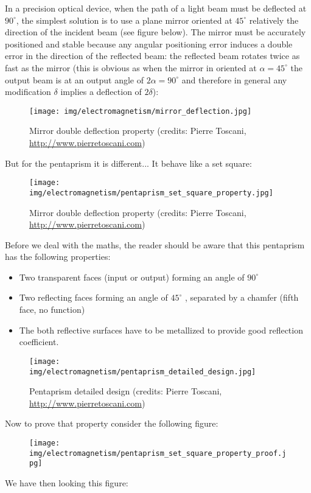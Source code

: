 	In a precision optical device, when the path of a light beam must be deflected at $90^\circ$, the simplest solution is to use a plane mirror oriented at $45^\circ$ relatively the direction of the incident beam (see figure below). The mirror must be accurately positioned and stable because any angular positioning error induces a double error in the direction of the reflected beam: the reflected beam rotates twice as fast as the mirror (this is obvious as when the mirror in oriented at $\alpha=45^\circ$ the output beam is at an output angle of $2\alpha=90^\circ$ and therefore in general any modification $\delta$ implies a deflection of $2\delta$):
	\begin{figure}[H]
		\centering
		\texttt{[image: img/electromagnetism/mirror\_deflection.jpg]}
		\caption{Mirror double deflection property (credits: Pierre Toscani, \url{http://www.pierretoscani.com})}
	\end{figure}
	But for the pentaprism it is different... It behave like a set square:
	\begin{figure}[H]
		\centering
		\texttt{[image: img/electromagnetism/pentaprism\_set\_square\_property.jpg]}
		\caption{Mirror double deflection property (credits: Pierre Toscani, \url{http://www.pierretoscani.com})}
	\end{figure}
	Before we deal with the maths, the reader should be aware that this pentaprism has the following properties:
	 \begin{itemize}
		\item Two transparent faces (input or output) forming an angle of $90^\circ$
		 \item Two reflecting faces forming an angle of $45^\circ$ , separated by a chamfer (fifth face, no function)
		\item The both reflective surfaces have to be metallized to provide good reflection coefficient.
	\end{itemize} 
	\begin{figure}[H]
		\centering
		\texttt{[image: img/electromagnetism/pentaprism\_detailed\_design.jpg]}
		\caption{Pentaprism detailed design (credits: Pierre Toscani, \url{http://www.pierretoscani.com})}
	\end{figure}
	Now to prove that property consider the following figure:
	\begin{figure}[H]
		\centering
		\texttt{[image: img/electromagnetism/pentaprism\_set\_square\_property\_proof.jpg]}
	\end{figure}
	We have then looking this figure:
	
